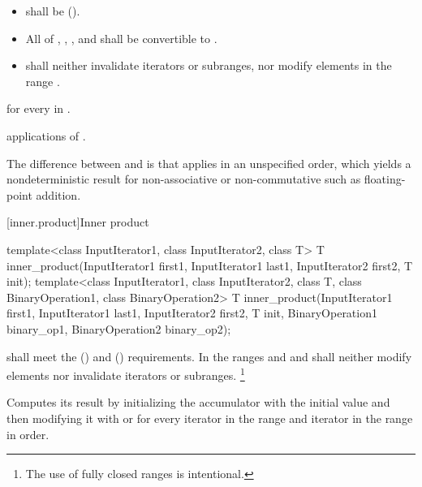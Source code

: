 \begin{itemdescr}
\pnum
\requires
\begin{itemize}
\item
   shall be  ().
\item
  All of , ,
  , and 
  shall be convertible to .
\item
   shall neither invalidate iterators or subranges,
  nor modify elements in the range .
\end{itemize}

\pnum
\returns
{}
for every  in .

\pnum
\complexity
{} applications of .

\pnum
\begin{note}
The difference between  and  is that
 applies  in an unspecified order,
which yields a nondeterministic result
for non-associative or non-commutative 
such as floating-point addition.
\end{note}
\end{itemdescr}

[inner.product]{Inner product}

%
\begin{itemdecl}
template<class InputIterator1, class InputIterator2, class T>
  T inner_product(InputIterator1 first1, InputIterator1 last1,
                  InputIterator2 first2, T init);
template<class InputIterator1, class InputIterator2, class T,
         class BinaryOperation1, class BinaryOperation2>
  T inner_product(InputIterator1 first1, InputIterator1 last1,
                  InputIterator2 first2, T init,
                  BinaryOperation1 binary_op1,
                  BinaryOperation2 binary_op2);
\end{itemdecl}

\begin{itemdescr}
\pnum
\requires
{} shall meet
the  ()
and  () requirements.
In the ranges  and
 and 
shall neither modify elements nor invalidate iterators or subranges.%
\footnote{The use of fully closed ranges is intentional.}

\pnum
\effects
Computes its result by
initializing the accumulator  with the initial value 
and then modifying it with
 or
for every iterator  in the range 
and iterator  in the range 
in order.
\end{itemdescr}

